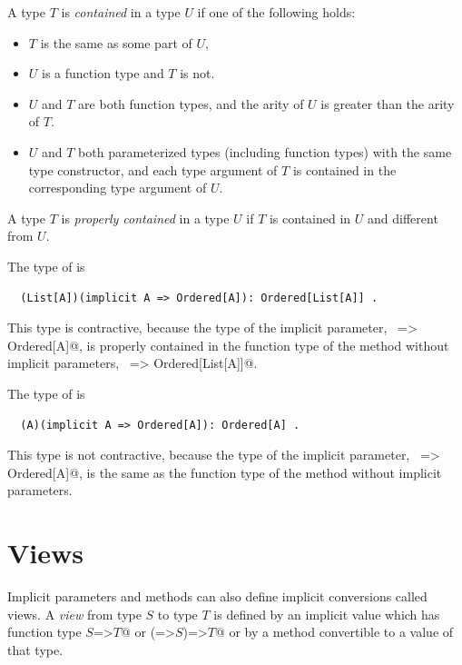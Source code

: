A type $T$ is {\em contained} in a type $U$ if one of the following holds:
\begin{itemize}
\item $T$ is the same as some part of $U$,  
\item $U$ is a function type and $T$ is not.
\item $U$ and $T$ are both function types, and the arity of $U$ is greater than 
      the arity of $T$.
\item $U$ and $T$ both parameterized types (including function types)
      with the same type constructor,
      and each type argument of $T$ is contained in the corresponding type argument of $U$.
\end{itemize}
A type $T$ is {\em properly contained} in a type $U$ if $T$ is contained
in $U$ and different from $U$.

\example The type of  is
\begin{lstlisting}
  (List[A])(implicit A => Ordered[A]): Ordered[List[A]] .
\end{lstlisting}
This type is contractive, because the type of the implicit parameter,
~\lstinline@A => Ordered[A]@, is properly contained in the function type
of the method without implicit parameters, ~\lstinline@List[A] => Ordered[List[A]]@.

The type of  is
\begin{lstlisting}
  (A)(implicit A => Ordered[A]): Ordered[A] .
\end{lstlisting}
This type is not contractive, because the type of the implicit parameter,
~\lstinline@A => Ordered[A]@, is the same as the function type
of the method without implicit parameters. 


\section{Views}\label{sec:views}

Implicit parameters and methods can also define implicit conversions
called views. A {\em view} from type $S$ to type $T$ is
defined by an implicit value which has function type
\lstinline@$S$=>$T$@ or \lstinline@(=>$S$)=>$T$@ or by a method convertible to a value of that
type.

